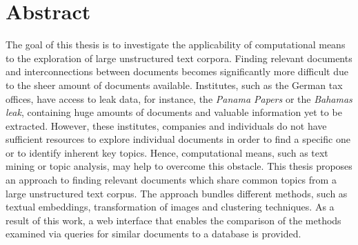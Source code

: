 \chapter*{Abstract}

The goal of this thesis is to investigate the applicability of computational means to the exploration of large unstructured text corpora.
Finding relevant documents and interconnections between documents becomes significantly more difficult due to the sheer amount of documents available.
Institutes, such as the German tax offices, have access to leak data, for instance, the \textit{Panama Papers} or the \textit{Bahamas leak}, 
containing huge amounts of documents and valuable information yet to be extracted.
However, these institutes, companies and individuals do not have sufficient resources to explore individual documents 
in order to find a specific one or to identify inherent key topics.
Hence, computational means, such as text mining or topic analysis, may help to overcome this obstacle.
This thesis proposes an approach to finding relevant documents which share common topics from a large unstructured text corpus.
The approach bundles different methods, such as textual embeddings, transformation of images and clustering techniques.
As a result of this work, a web interface that enables the comparison of the methods examined via queries for similar documents to a database is provided. 
